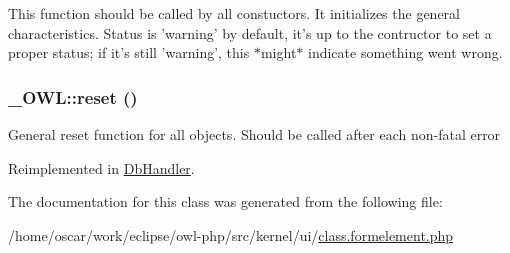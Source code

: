 This function should be called by all constuctors. It initializes the general characteristics. Status is 'warning' by default, it's up to the contructor to set a proper status; if it's still 'warning', this $\ast$might$\ast$ indicate something went wrong. \hypertarget{class__OWL_2f2a042bcf31965194c03033df0edc9b}{
\subsubsection{\setlength{\rightskip}{0pt plus 5cm}\_\-OWL::reset ()}}
\label{class__OWL_2f2a042bcf31965194c03033df0edc9b}


General reset function for all objects. Should be called after each non-fatal error 

Reimplemented in \hyperlink{classDbHandler_9982df4830f05803935bb31bac7fae3d}{DbHandler}.

The documentation for this class was generated from the following file:\begin{CompactItemize}
\item 
/home/oscar/work/eclipse/owl-php/src/kernel/ui/\hyperlink{class_8formelement_8php}{class.formelement.php}\end{CompactItemize}
